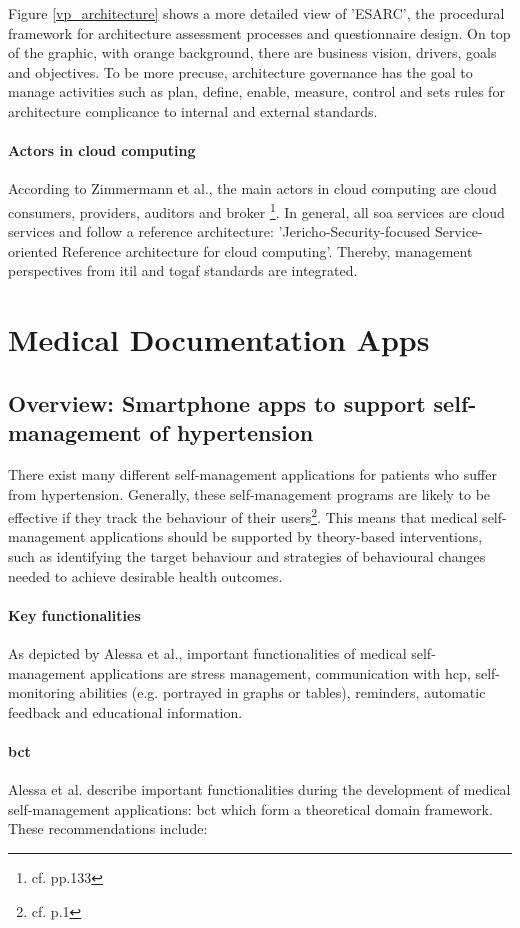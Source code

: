 Figure \ref{vp_architecture} shows a more detailed view of 'ESARC', the procedural framework for architecture assessment processes and questionnaire design. On top of the graphic, with orange background, there are business vision, drivers, goals and objectives. To be more precuse, architecture governance has the goal to manage activities such as plan, define, enable, measure, control and sets rules for architecture complicance to internal and external standards. 

\paragraph{Actors in cloud computing}
According to Zimmermann et al., the main actors in cloud computing are cloud consumers, providers, auditors and broker \footnote{cf.\autocite{zimmermann} pp.133}. In general, all \ac{soa} services are cloud services and follow a reference architecture: 'Jericho-Security-focused Service-oriented Reference architecture for cloud computing'. Thereby, management perspectives from \ac{itil} and \ac{togaf} standards are integrated.

\section{Medical Documentation Apps}

\subsection{Overview: Smartphone apps to support self-management of hypertension}
There exist many different self-management applications for patients who suffer from hypertension. Generally, these self-management programs are likely to be effective if they track the behaviour of their users\footnote{cf.\autocite{alessa} p.1}. This means that medical self-management applications should be supported by theory-based interventions, such as identifying the target behaviour and strategies of behavioural changes needed to achieve desirable health outcomes.
\paragraph{Key functionalities}
As depicted by Alessa et al., important functionalities of medical self-management applications are stress management, communication with \ac{hcp}, self-monitoring abilities (e.g. portrayed in graphs or tables), reminders, automatic feedback and educational information.
\paragraph{\ac{bct}}
Alessa et al. describe important functionalities during the development of medical self-management applications: \ac{bct} which form a theoretical domain framework. These recommendations include:

